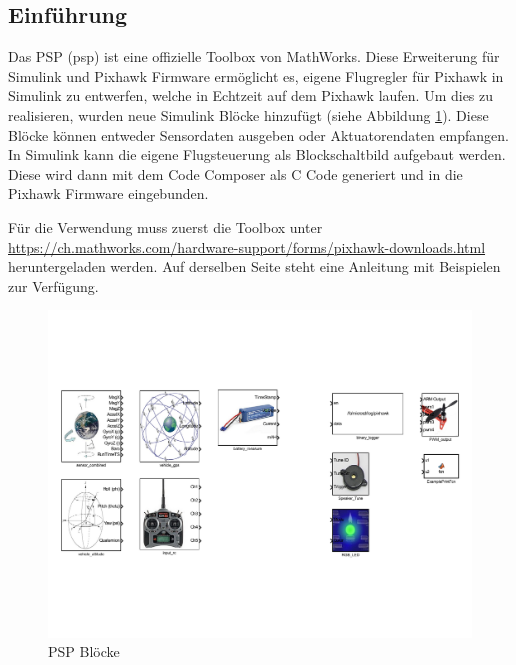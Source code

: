 \subsection{Einführung}
Das PSP (\acrlong{psp}) ist eine offizielle Toolbox von MathWorks. Diese Erweiterung für Simulink und Pixhawk Firmware ermöglicht es, eigene Flugregler für Pixhawk in Simulink zu entwerfen, welche in Echtzeit auf dem Pixhawk laufen. Um dies zu realisieren, wurden neue Simulink Blöcke hinzufügt (siehe Abbildung \ref{fig:psp_all_blocks}). Diese Blöcke können entweder Sensordaten ausgeben oder Aktuatorendaten empfangen. \\
In Simulink kann die eigene Flugsteuerung als Blockschaltbild aufgebaut werden. Diese wird dann mit dem Code Composer als C Code generiert und in die Pixhawk Firmware eingebunden. 
 
\noindent Für die Verwendung muss zuerst die Toolbox unter  \href{https://ch.mathworks.com/hardware-support/forms/pixhawk-downloads.html}{https://ch.mathworks.com/hardware-support/forms/pixhawk-downloads.html} heruntergeladen werden. Auf derselben Seite steht eine Anleitung mit Beispielen zur Verfügung.

\begin{figure}[ht]
  \begin{center}
  \includegraphics[scale=0.5, trim={0.5cm 5cm 0.5cm 5cm},clip]{pic/40_psp/all_blocks.pdf}
  \caption{PSP Blöcke}
  \label{fig:psp_all_blocks}
  \end{center}
\end{figure}
